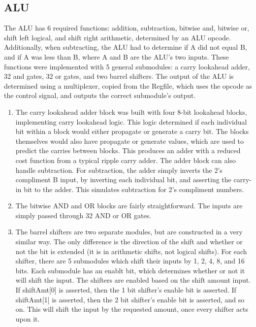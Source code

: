 \documentclass[letterpaper]{article} %
\begin{document}
\subsection*{ALU}
The ALU has 6 required functions: addition, subtraction, bitwise and, bitwise or, shift left logical, and shift right arithmetic, determined by an ALU opcode. Additionally, when subtracting, the ALU had to determine if A did not equal B, and if A was less than B, where A and B are the ALU's two inputs. These functions were implemented with 5 general submodules: a carry lookahead adder, 32 and gates, 32 or gates, and two barrel shifters. The output of the ALU is determined using a multiplexer, copied from the Regfile, which uses the opcode as the control signal, and outputs the correct submodule's output.  \\
\begin{enumerate}
\item The carry lookahead adder block was built with four 8-bit lookahead blocks, implementing carry lookahead logic. This logic determined if each individual bit within a block would either propagate or generate a carry bit. The blocks themselves would also have propagate or generate values, which are used to predict the carries between blocks. This produces an adder with a reduced cost function from a typical ripple carry adder. The adder block can also handle subtraction. For subtraction, the adder simply inverts the 2's compliment B input, by inverting each individual bit, and asserting the carry-in bit to the adder. This simulates subtraction for 2's compliment numbers. \\
\item The bitwise AND and OR blocks are fairly straightforward. The inputs are simply passed through 32 AND or OR gates. \\
\item The barrel shifters are two separate modules, but are constructed in a very similar way. The only difference is the direction of the shift and whether or not the bit is extended (it is in arithmetic shifts, not logical shifts). For each shifter, there are 5 submodules which shift their inputs by 1, 2, 4, 8, and 16 bits. Each submodule has an enablt bit, which determines whether or not it will shift the input. The shifters are enabled based on the shift amount input. If shiftAmt[0] is asserted, then the 1 bit shifter's enable bit is asserted. If shiftAmt[1] is asserted, then the 2 bit shifter's enable bit is asserted, and so on. This will shift the input by the requested amount, once every shifter acts upon it. \\

\end{enumerate}
\end{document}
